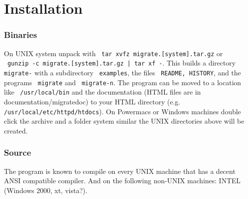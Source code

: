 \chapter{Installation}
\subsection{Binaries}
On UNIX system unpack with \texttt{ tar xvfz migrate.[system].tar.gz} or\\ \texttt{ gunzip -c migrate\VERSION .[system].tar.gz | tar xf -}.
This builds a directory \texttt{ migrate-\VERSION}
with a subdirectory \texttt{ examples},
the files \texttt{ README, HISTORY}, and the programs 
\texttt{ migrate} and \texttt{ migrate-n}. 
The program can be moved to a location like \texttt{ /usr/local/bin} 
and the documentation (HTML files are in documentation/migratedoc) to
your HTML directory (e.g. \texttt{ /usr/local/etc/httpd/htdocs}).
On Powermacs or Windows machines double click the archive 
and a folder system similar the UNIX directories above will be created.

\subsection{Source}
The program is known to compile on
every UNIX machine that has a decent ANSI compatible compiler.
And on the following non-UNIX machines:  INTEL (Windows 2000, xt, vista?).

